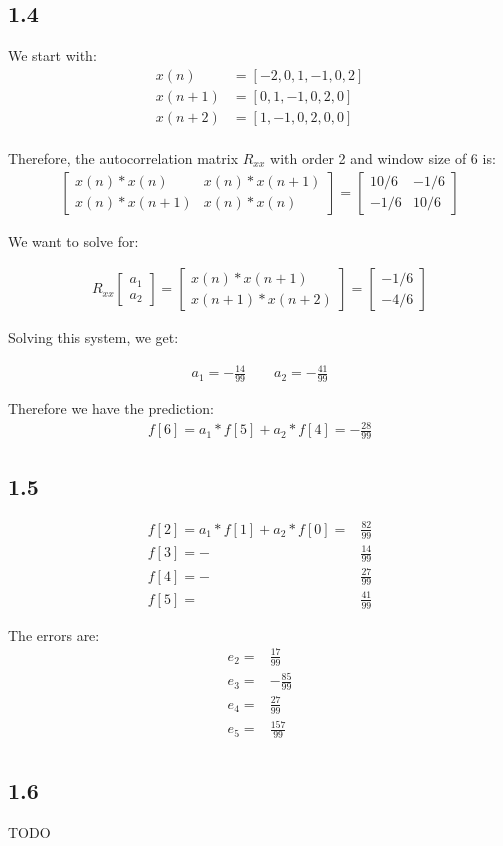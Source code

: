 \documentclass[12pt]{article}
\begin{document}
\subsection*{1.4}
We start with:
\begin{align*}
x(n) &= [-2, 0, 1, -1, 0, 2]\\
x(n+1) &= [0, 1, -1, 0, 2, 0]\\
x(n+2) &= [1, -1, 0, 2, 0, 0]\\
\end{align*}

Therefore, the autocorrelation matrix $R_{xx}$ with order 2 and window size of 6 is:
\begin{align*}
\begin{bmatrix}
x(n)*x(n) & x(n)*x(n+1) \\
x(n)*x(n+1) & x(n)*x(n)
\end{bmatrix}
= \begin{bmatrix}
10/6 & -1/6 \\
-1/6 & 10/6
\end{bmatrix}
\end{align*}

We want to solve for:

\begin{align*}
R_{xx}
\begin{bmatrix}
a_1 \\
a_2
\end{bmatrix}
=
\begin{bmatrix}
x(n) * x(n+1) \\
x(n+1) * x(n+2)
\end{bmatrix}
=
\begin{bmatrix}
-1/6 \\
-4/6
\end{bmatrix}
\end{align*}

Solving this system, we get:

\begin{align*}
a_1 = -\frac{14}{99} \qquad a_2 = -\frac{41}{99}
\end{align*}

Therefore we have the prediction:
\begin{align*}
f[6] = a_1 * f[5] + a_2 * f[4] = -\frac{28}{99}
\end{align*}


\subsection*{1.5}
\begin{align*}
f[2] = a_1 * f[1] + a_2 * f[0] = &\frac{82}{99} \\
f[3] = -&\frac{14}{99} \\
f[4] = -&\frac{27}{99} \\
f[5] = &\frac{41}{99}
\end{align*}

The errors are:\\
\begin{align*}
e_2 =  &\frac{17}{99}\\
e_3 = &-\frac{85}{99}\\
e_4 =&  \frac{27}{99}\\
e_5 =& \frac{157}{99}\\
\end{align*}

\subsection*{1.6}
TODO
\end{document}
